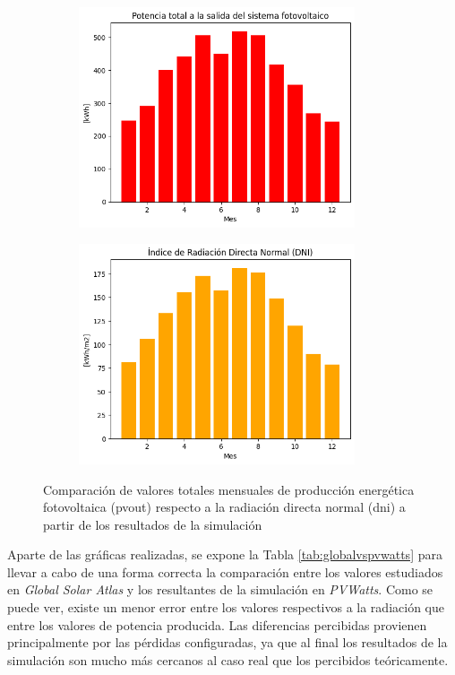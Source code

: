\begin{figure}[H]
    \centering    
    \begin{subfigure}{0.5\linewidth}
        \centering
        \includegraphics[width=\linewidth,height=6.5cm]{img/diseno/averagepvoutreal.png}
        \label{fig:averagepvoutreal}
    \end{subfigure}\hfill
    \begin{subfigure}{0.5\linewidth}
        \centering
        \includegraphics[width=\linewidth,height=6.5cm]{img/diseno/averagednireal.png}
        \label{fig:averagednireal}
    \end{subfigure}    
    \caption{Comparación de valores totales mensuales de producción energética fotovoltaica (\acrshort{pvout}) respecto a la radiación directa normal (\acrshort{dni}) a partir de los resultados de la simulación}
    \label{fig:averagereal}
\end{figure}

\pagebreak

Aparte de las gráficas realizadas, se expone la Tabla \ref{tab:globalvspvwatts} para llevar a cabo de una forma correcta la comparación entre los valores estudiados en \textit{Global Solar Atlas} y los resultantes de la simulación en \textit{PVWatts}. Como se puede ver, existe un menor error entre los valores respectivos a la radiación que entre los valores de potencia producida. Las diferencias percibidas provienen principalmente por las pérdidas configuradas, ya que al final los resultados de la simulación son mucho más cercanos al caso real que los percibidos teóricamente. 

